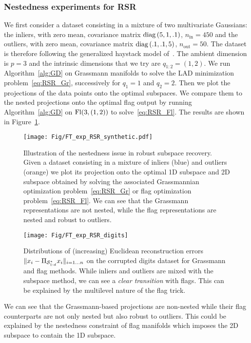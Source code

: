 \subsubsection{Nestedness experiments for RSR}
We first consider a dataset consisting in a mixture of two multivariate Gaussians: the inliers, with zero mean, covariance matrix $\diag{5, 1, .1}$, $n_\mathrm{in} = 450$ and the outliers, with zero mean, covariance matrix $\diag{.1, .1, 5}$, $n_\mathrm{out} = 50$. The dataset is therefore following the generalized haystack model of~\citet{maunu_well-tempered_2019}.
The ambient dimension is $p = 3$ and the intrinsic dimensions that we try are $q_{1:2} = (1, 2)$.
We run Algorithm~\ref{alg:GD} on Grassmann manifolds to solve the LAD minimization problem~\eqref{eq:RSR_Gr}, successively for $q_1 = 1$ and $q_2 = 2$. Then we plot the projections of the data points onto the optimal subspaces. We compare them to the nested projections onto the optimal flag output by running Algorithm~\ref{alg:GD} on $\Fl(3, (1, 2))$ to solve~\eqref{eq:RSR_Fl}. The results are shown in Figure~\ref{fig:RSR_nested}.
\begin{figure}
	\centering
    \texttt{[image: Fig/FT\_exp\_RSR\_synthetic.pdf]}
    \caption{
    Illustration of the nestedness issue in robust subspace recovery. Given a dataset consisting in a mixture of inliers (blue) and outliers (orange) we plot its projection onto the optimal 1D subspace and 2D subspace obtained by solving the associated Grassmannian optimization problem~\eqref{eq:RSR_Gr} or flag optimization problem~\eqref{eq:RSR_Fl}. 
    We can see that the Grassmann representations are not nested, while the flag representations are nested and robust to outliers.}
	\label{fig:RSR_nested}
\end{figure}
\begin{figure}
	\centering
    \texttt{[image: Fig/FT\_exp\_RSR\_digits]}
    \caption{Distributions of (increasing) Euclidean reconstruction errors $\|x_i - \Pi_{\S_{1:d}^*} x_i\|_{i=1\dots n}$ on the corrupted digits dataset for Grassmann and flag methods. While inliers and outliers are mixed with the subspace method, we can see a \textit{clear transition} with flags. This can be explained by the multilevel nature of the flag trick.}
	\label{fig:RSR_outlier}
\end{figure}
We can see that the Grassmann-based projections are non-nested while their flag counterparts are not only nested but also robust to outliers. This could be explained by the nestedness constraint of flag manifolds which imposes the 2D subspace to contain the 1D subspace.


